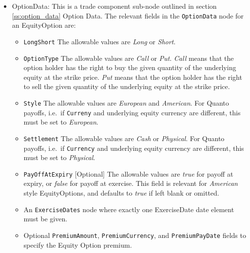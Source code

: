 \begin{itemize}
	\item OptionData: This is a trade component sub-node outlined in section \ref{ss:option_data} Option Data. The relevant fields in the \lstinline!OptionData! node for an EquityOption are:

	
	\begin{itemize}
	\item \lstinline!LongShort! The allowable values are \emph{Long} or \emph{Short}.

	\item \lstinline!OptionType! The allowable values are \emph{Call} or \emph{Put}.  \emph{Call} means that the option holder has the right to buy the given quantity of the underlying equity at the strike price.  \emph{Put} means that the option holder has the right to sell the given quantity of the underlying equity at the strike price. 
	
\item  \lstinline!Style! The allowable values are \emph{European} and \emph{American}. For Quanto payoffs, i.e.\ if \lstinline!Curreny! and underlying equity currency are different, this must be set to \emph{European}.

\item  \lstinline!Settlement! The allowable values are \emph{Cash} or \emph{Physical}. For Quanto payoffs, i.e.\ if \lstinline!Currency! and underlying equity currency are different, this must be set to \emph{Physical}.

\item \lstinline!PayOffAtExpiry! [Optional] The allowable values are \emph{true} for payoff at expiry, or \emph{false} for payoff at exercise. This field is relevant for \emph{American} style EquityOptions, and defaults to \emph{true} if left blank or omitted. 

\item An \lstinline!ExerciseDates! node where exactly one ExerciseDate date element must be given. 

\item Optional \lstinline!PremiumAmount!,  \lstinline!PremiumCurrency!, and \lstinline!PremiumPayDate! fields to specify the Equity Option premium. 

\end{itemize}
	


\end{itemize}
